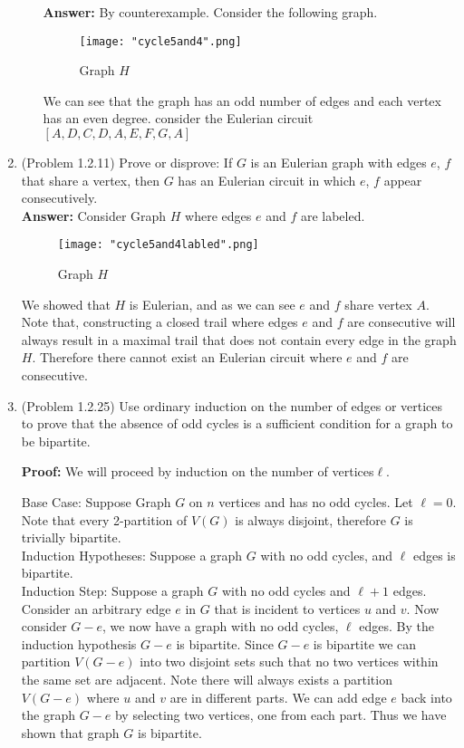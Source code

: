 \documentclass{amsart}
\begin{document}
\begin{enumerate}
\begin{enumerate}
	\textbf{Answer:} By counterexample. Consider the following graph. 
\begin{figure}[H]
\caption{Graph $H$}
\centering
\texttt{[image: "cycle5and4".png]}
\end{figure}
 We can see that the graph has an odd number of edges and each vertex has an even degree. consider the Eulerian circuit $[A,D,C,D,A,E,F,G,A]$
	
	\vspace{0.25in}
	\end{enumerate}

\item (Problem 1.2.11) Prove or disprove: If $G$ is an Eulerian graph with edges $e$, $f$ that share a vertex, then $G$ has an Eulerian circuit in which $e$, $f$ appear consecutively.\\


	\textbf{Answer:} Consider Graph $H$ where edges $e$ and $f$ are labeled.\\
	\begin{figure}[H]
\caption{Graph $H$}
\centering
\texttt{[image: "cycle5and4labled".png]}
\end{figure}
We showed that $H$ is Eulerian, and as we can see $e$ and $f$ share vertex $A$.
Note that, constructing a closed trail where edges $e$ and $f$ are consecutive will always result in a maximal trail that does not contain every edge in the graph $H$. Therefore there cannot exist an Eulerian circuit where $e$ and $f$ are consecutive. 

	\vspace{0.25in}

\item (Problem 1.2.25) Use ordinary induction on the number of edges or vertices to prove that the absence of odd cycles is a sufficient condition for a graph to be bipartite. 


	\textbf{Proof:} We will proceed by induction on the number of vertices$\ell$.

Base Case: Suppose Graph $G$ on $n$ vertices and has no odd cycles. Let $\ell = 0$. Note that every 2-partition of $V(G)$ is always disjoint, therefore $G$ is trivially bipartite.\\

Induction Hypotheses: Suppose a graph $G$ with no odd cycles, and $\ell$ edges is bipartite.\\

Induction Step: Suppose a graph $G$ with no odd cycles and $\ell+1$ edges. Consider an arbitrary edge $e$ in $G$ that is incident to vertices $u$ and $v$. Now consider $G-e$, we now have a graph with no odd cycles, $\ell$ edges. By the induction hypothesis $G-e$ is bipartite. Since $G-e$ is bipartite we can partition $V(G-e)$ into two disjoint sets such that no two vertices within the same set are adjacent. Note there will always exists a partition $V(G-e)$ where $u$ and $v$ are in different parts.  We can add edge $e$ back into the graph $G-e$ by selecting two vertices, one from each part. Thus we have shown that graph $G$ is bipartite. \\


\end{enumerate}
\end{document}
